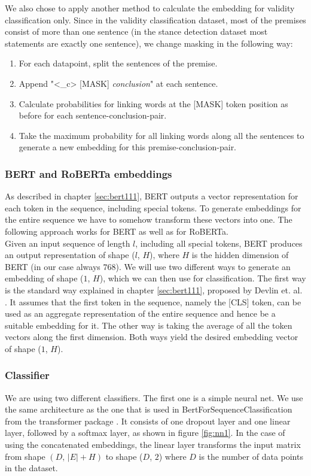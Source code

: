We also chose to apply another method to calculate the embedding for validity classification only. Since in the validity classification dataset, most of the premises consist of more than one sentence (in the stance detection dataset most statements are exactly one sentence), we change masking in the following way: \\
\begin{enumerate}
	\item For each datapoint, split the sentences of the premise.
	\item Append "<\_c> [MASK] \textit{conclusion}" at each sentence.
	\item Calculate probabilities for linking words at the [MASK] token position as before for each sentence-conclusion-pair.
	\item Take the maximum probability for all linking words along all the sentences to generate a new embedding for this premise-conclusion-pair.
\end{enumerate}

\subsubsection{BERT and RoBERTa embeddings} \label{sec:bertembeddings}
As described in chapter \ref{sec:bert111}, BERT outputs a vector representation for each token in the sequence, including special tokens. To generate embeddings for the entire sequence we have to somehow transform these vectors into one. The following approach works for BERT as well as for RoBERTa.\\
Given an input sequence of length $l$, including all special tokens, BERT produces an output representation of shape ($l$, $H$), where $H$ is the hidden dimension of BERT (in our case always $768$). We will use two different ways to generate an embedding of shape ($1$, $H$), which we can then use for classification. The first way is the standard way explained in chapter \ref{sec:bert111}, proposed by Devlin et. al. \cite{bert}. It assumes that the first token in the sequence, namely the [CLS] token, can be used as an aggregate representation of the entire sequence and hence be a suitable embedding for it. The other way is taking the average of all the token vectors along the first dimension. Both ways yield the desired embedding vector of shape ($1$, $H$).

\subsubsection{Classifier}
We are using two different classifiers. The first one is a simple neural net. We use the same architecture as the one that is used in BertForSequenceClassification from the transformer package \cite{bertimpl}. It consists of one dropout layer and one linear layer, followed by a softmax layer, as shown in figure \ref{fig:nn1}. In the case of using the concatenated embeddings, the linear layer transforms the input matrix from shape $(D, \, |E| + H)$ to shape ($D$, $2$) where $D$ is the number of data points in the dataset. 

